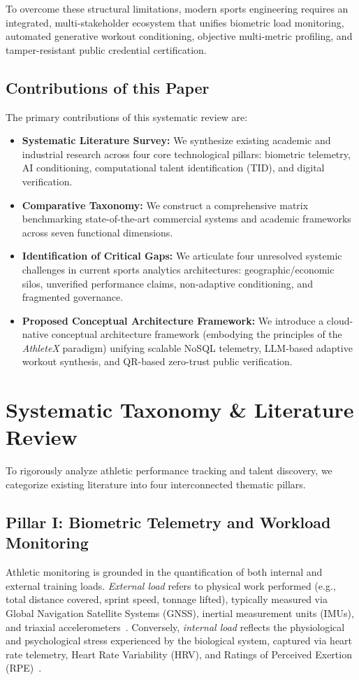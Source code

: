 \documentclass[conference]{IEEEtran}
\begin{document}
To overcome these structural limitations, modern sports engineering requires an integrated, multi-stakeholder ecosystem that unifies biometric load monitoring, automated generative workout conditioning, objective multi-metric profiling, and tamper-resistant public credential certification.

\subsection{Contributions of this Paper}
The primary contributions of this systematic review are:
\begin{itemize}
    \item \textbf{Systematic Literature Survey:} We synthesize existing academic and industrial research across four core technological pillars: biometric telemetry, AI conditioning, computational talent identification (TID), and digital verification.
    \item \textbf{Comparative Taxonomy:} We construct a comprehensive matrix benchmarking state-of-the-art commercial systems and academic frameworks across seven functional dimensions.
    \item \textbf{Identification of Critical Gaps:} We articulate four unresolved systemic challenges in current sports analytics architectures: geographic/economic silos, unverified performance claims, non-adaptive conditioning, and fragmented governance.
    \item \textbf{Proposed Conceptual Architecture Framework:} We introduce a cloud-native conceptual architecture framework (embodying the principles of the \textit{AthleteX} paradigm) unifying scalable NoSQL telemetry, LLM-based adaptive workout synthesis, and QR-based zero-trust public verification.
\end{itemize}

\section{Systematic Taxonomy \& Literature Review}
To rigorously analyze athletic performance tracking and talent discovery, we categorize existing literature into four interconnected thematic pillars.

\subsection{Pillar I: Biometric Telemetry and Workload Monitoring}
Athletic monitoring is grounded in the quantification of both internal and external training loads. \textit{External load} refers to physical work performed (e.g., total distance covered, sprint speed, tonnage lifted), typically measured via Global Navigation Satellite Systems (GNSS), inertial measurement units (IMUs), and triaxial accelerometers~\cite{buchheit2013}. Conversely, \textit{internal load} reflects the physiological and psychological stress experienced by the biological system, captured via heart rate telemetry, Heart Rate Variability (HRV), and Ratings of Perceived Exertion (RPE)~\cite{halson2014}.
\end{document}
